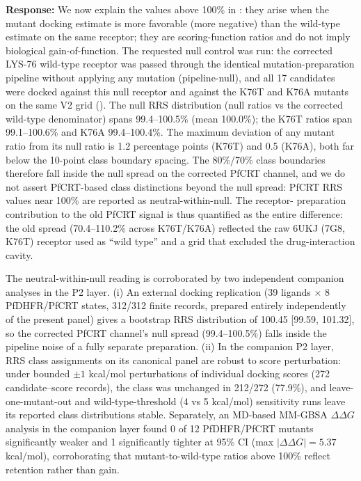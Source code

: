\documentclass[11pt]{article}
\begin{document}
\textbf{Response:} We now explain the values above 100\% in : they arise when the
mutant docking estimate is more favorable (more negative) than the wild-type estimate on the
same receptor; they are scoring-function ratios and do not imply biological gain-of-function.
The requested null control was run: the corrected LYS-76 wild-type receptor was passed through
the identical mutation-preparation pipeline without applying any mutation (pipeline-null), and
all 17 candidates were docked against this null receptor and against the K76T and K76A
mutants on the same V2 grid (). The null RRS distribution (null ratios vs the
corrected wild-type denominator) spans 99.4--100.5\% (mean 100.0\%); the K76T ratios span
99.1--100.6\% and K76A 99.4--100.4\%. The maximum deviation of any mutant ratio from its null
ratio is 1.2 percentage points (K76T) and 0.5 (K76A), both far below the 10-point class
boundary spacing. The 80\%/70\% class boundaries therefore fall inside the null spread on the
corrected PfCRT channel, and we do not assert PfCRT-based class distinctions beyond the null
spread: PfCRT RRS values near 100\% are reported as neutral-within-null. The receptor-
preparation contribution to the old PfCRT signal is thus quantified as the entire difference:
the old spread (70.4--110.2\% across K76T/K76A) reflected the raw 6UKJ (7G8, K76T)
receptor used as ``wild type'' and a grid that excluded the drug-interaction cavity.

The neutral-within-null reading is corroborated by two independent companion
analyses in the P2 layer. (i) An external docking replication (39 ligands
$\times$ 8 PfDHFR/PfCRT states, 312/312 finite records, prepared entirely
independently of the present panel) gives a bootstrap RRS distribution of 100.45
[99.59, 101.32], so the corrected PfCRT channel's null spread (99.4--100.5\%)
falls inside the pipeline noise of a fully separate preparation. (ii) In the
companion P2 layer, RRS class assignments on its canonical panel are robust to
score perturbation: under bounded $\pm1$ kcal/mol perturbations of individual
docking scores (272 candidate--score records), the class was unchanged in
212/272 (77.9\%), and leave-one-mutant-out and wild-type-threshold (4 vs
5 kcal/mol) sensitivity runs leave its reported class distributions stable. Separately, an MD-based MM-GBSA $\Delta\Delta G$ analysis
in the companion layer found 0 of 12 PfDHFR/PfCRT mutants significantly weaker
and 1 significantly tighter at 95\% CI (max $|\Delta\Delta G|=5.37$ kcal/mol),
corroborating that mutant-to-wild-type ratios above 100\% reflect retention
rather than gain.
\end{document}
